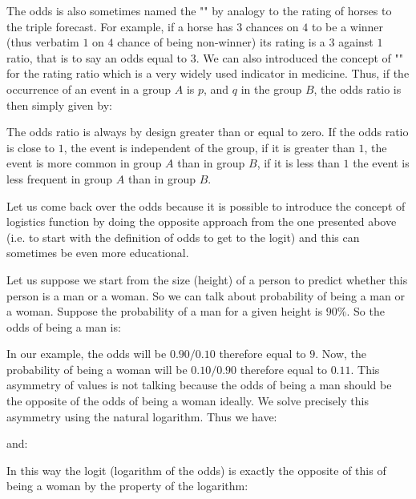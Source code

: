 	\pagebreak
	\begin{tcolorbox}[title=Remark,colframe=black,arc=10pt]
	The odds is also sometimes named the "" by analogy to the rating of horses to the triple forecast. For example, if a horse has $3$ chances on $4$ to be a winner (thus verbatim $1$ on $4$ chance of being non-winner) its rating is a $3$ against $1$ ratio, that is to say an odds equal to $3$. We can also introduced the concept of "" for the rating ratio which is a very widely used indicator in medicine. Thus, if the occurrence of an event in a group $A$ is $p$, and $q$ in the group $B$, the odds ratio is then simply given by:
	
	The odds ratio is always by design greater than or equal to zero. If the odds ratio is close to $1$, the event is independent of the group, if it is greater than $1$, the event is more common in group $A$ than in group $B$, if it is less than $1$ the event is less frequent in group $A$ than in group $B$.
	\end{tcolorbox}
	Let us come back over the odds because it is possible to introduce the concept of logistics function by doing the opposite approach from the one presented above (i.e. to start with the definition of odds to get to the logit) and this can sometimes be even more educational.
	
	Let us suppose we start from the size (height) of a person to predict whether this person is a man or a woman. So we can talk about probability of being a man or a woman. Suppose the probability of a man for a given height is $90\%$. So the odds of being a man is:
	
	In our example, the odds will be $0.90 / 0.10$ therefore equal to $9$. Now, the probability of being a woman will be $0.10 / 0.90$ therefore equal to $0.11$. This asymmetry of values is not talking because the odds of being a man should be the opposite of the odds of being a woman ideally. We solve precisely this asymmetry using the natural logarithm. Thus we have:
	
	and:
	
	In this way the logit (logarithm of the odds) is exactly the opposite of this of being a woman by the property of the logarithm:
	
